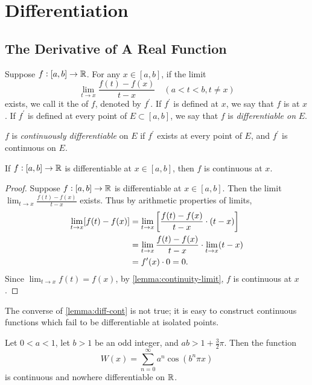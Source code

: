 \chapter{Differentiation}\label{chap:differentiation}
\section{The Derivative of A Real Function}
\begin{definition}[Derivative]
Suppose $f:[a,b]\to\mathbb R$. For any $x\in[a,b]$, if the limit
\[\lim_{t\to x}\frac{f(t)-f(x)}{t-x}\quad(a<t<b,t\neq x)\]
exists, we call it the  of $f$, denoted by $f^\prime$. 
If $f^\prime$ is defined at $x$, we say that $f$ is  at $x$. If $f^\prime$ is defined at every point of $E\subset[a,b]$, we say that $f$ is \emph{differentiable on} $E$.

$f$ is \emph{continuously differentiable} on $E$ if $f^\prime$ exists at every point of $E$, and $f^\prime$ is continuous on $E$.
\end{definition}

\begin{lemma}\label{lemma:diff-cont}
If $f:[a,b]\to\mathbb R$ is differentiable at $x\in[a,b]$, then $f$ is continuous at $x$.
\end{lemma}

\begin{proof}
Suppose $f:[a,b]\to\mathbb R$ is differentiable at $x\in[a,b]$. Then the limit $\displaystyle\lim_{t\to x}\frac{f(t)-f(x)}{t-x}$ exists. Thus by arithmetic properties of limits,
\begin{align*}
\lim_{t\to x}[f(t)-f(x)]
&=\lim_{t\to x}\left[\frac{f(t)-f(x)}{t-x}\cdot(t-x)\right]\\
&=\lim_{t\to x}\frac{f(t)-f(x)}{t-x}\cdot\lim_{t\to x}(t-x)\\
&=f^\prime(x)\cdot0=0.
\end{align*}
Since $\displaystyle\lim_{t\to x}f(t)=f(x)$, by \cref{lemma:continuity-limit}, $f$ is continuous at $x$.
\end{proof}

\begin{remark}
The converse of \cref{lemma:diff-cont} is not true; it is easy to construct continuous functions which fail to be differentiable at isolated points.
\end{remark}

\begin{example}
Let $0<a<1$, let $b>1$ be an odd integer, and $ab>1+\frac{3}{2}\pi$. Then the function
\[W(x)=\sum_{n=0}^{\infty}a^n\cos(b^n\pi x)\]
is continuous and nowhere differentiable on $\mathbb R$.
\end{example}

